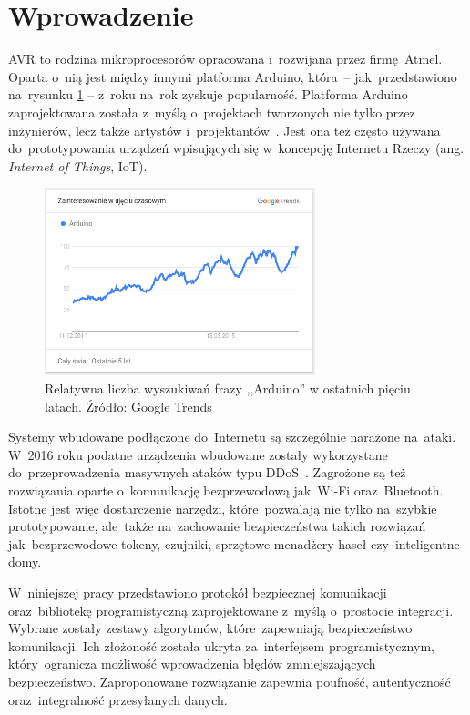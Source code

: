 \chapter*{Wprowadzenie}
\label{cha:wstep}

AVR to rodzina mikroprocesorów opracowana i~rozwijana przez firmę Atmel. Oparta o~nią jest między innymi platforma Arduino, która~-- jak~przedstawiono na~rysunku \ref{fig:arduinotrends} -- z~roku na~rok zyskuje popularność. Platforma Arduino zaprojektowana została z~myślą o~projektach tworzonych nie tylko przez inżynierów, lecz także artystów i~projektantów~\cite{BanShi14}. Jest ona też często używana do~prototypowania urządzeń wpisujących się w~koncepcję Internetu Rzeczy (ang. \emph{Internet of Things}, IoT).

\begin{figure}[h]
\centering
\includegraphics[width=0.7\textwidth]{images/arduino-trends.png}
\caption{Relatywna liczba wyszukiwań frazy ,,Arduino'' w ostatnich pięciu latach. Źródło: Google Trends}
\label{fig:arduinotrends}
\end{figure}

Systemy wbudowane podłączone do~Internetu są szczególnie narażone na~ataki. W~2016 roku podatne urządzenia wbudowane zostały wykorzystane do~przeprowadzenia masywnych ataków typu DDoS~\cite{AkaIOT}. Zagrożone są też rozwiązania oparte o~komunikację bezprzewodową jak~Wi-Fi oraz~Bluetooth. Istotne jest więc dostarczenie narzędzi, które~pozwalają nie tylko na~szybkie prototypowanie, ale~także na~zachowanie bezpieczeństwa takich rozwiązań jak~bezprzewodowe tokeny, czujniki, sprzętowe menadżery haseł czy~inteligentne domy.

W~niniejszej pracy przedstawiono protokół bezpiecznej komunikacji oraz~bibliotekę programistyczną zaprojektowane z~myślą o~prostocie integracji. Wybrane zostały zestawy algorytmów, które~zapewniają bezpieczeństwo komunikacji. Ich złożoność została ukryta za~interfejsem programistycznym, który~ogranicza możliwość wprowadzenia błędów zmniejszających bezpieczeństwo. Zaproponowane rozwiązanie zapewnia poufność, autentyczność oraz~integralność przesyłanych danych.

